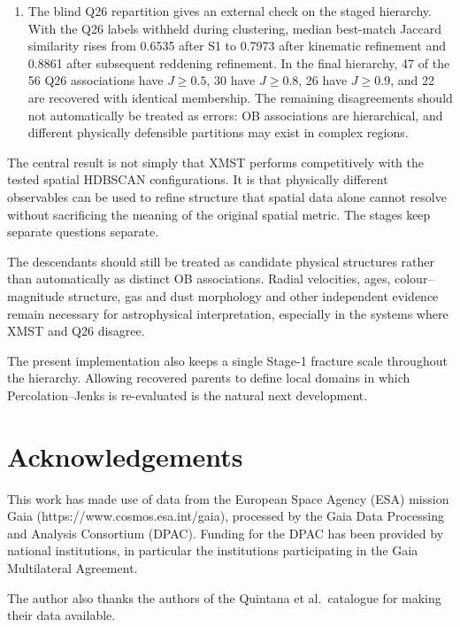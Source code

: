 \documentclass[fleqn,usenatbib]{rasti}
\begin{document}
\begin{enumerate}
\item The blind Q26 repartition gives an external check on the staged hierarchy. With the Q26 labels withheld during clustering, median best-match Jaccard similarity rises from 0.6535 after S1 to 0.7973 after kinematic refinement and 0.8861 after subsequent reddening refinement. In the final hierarchy, 47 of the 56 Q26 associations have $J\geq0.5$, 30 have $J\geq0.8$, 26 have $J\geq0.9$, and 22 are recovered with identical membership. The remaining disagreements should not automatically be treated as errors: OB associations are hierarchical, and different physically defensible partitions may exist in complex regions.

\end{enumerate}

The central result is not simply that XMST performs competitively with the tested spatial HDBSCAN configurations. It is that physically different observables can be used to refine structure that spatial data alone cannot resolve without sacrificing the meaning of the original spatial metric. The stages keep separate questions separate.

The descendants should still be treated as candidate physical structures rather than automatically as distinct OB associations. Radial velocities, ages, colour--magnitude structure, gas and dust morphology and other independent evidence remain necessary for astrophysical interpretation, especially in the systems where XMST and Q26 disagree.

The present implementation also keeps a single Stage-1 fracture scale throughout the hierarchy. Allowing recovered parents to define local domains in which Percolation--Jenks is re-evaluated is the natural next development.

\section*{Acknowledgements}


This work has made use of data from the European Space Agency (ESA) mission Gaia (https://www.cosmos.esa.int/gaia), processed by the Gaia Data Processing and Analysis Consortium (DPAC). Funding for the DPAC has been provided by national institutions, in particular the institutions participating in the Gaia Multilateral Agreement.

The author also thanks the authors of the Quintana et al.\ catalogue for making their data available.
\end{document}
